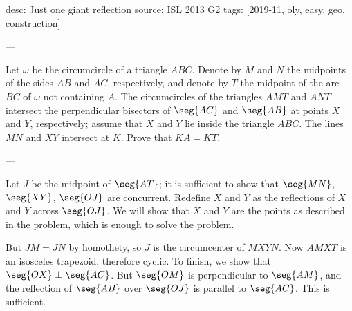 desc: Just one giant reflection
source: ISL 2013 G2
tags: [2019-11, oly, easy, geo, construction]

---

Let $\omega$ be the circumcircle of a triangle $ABC$. Denote by $M$ and $N$ the midpoints of the sides $AB$ and $AC$, respectively, and denote by $T$ the midpoint of the arc $BC$ of $\omega$ not containing $A$. The circumcircles of the triangles $AMT$ and $ANT$ intersect the perpendicular bisectors of $\seg{AC}$ and $\seg{AB}$ at points $X$ and $Y$, respectively; assume that $X$ and $Y$ lie inside the triangle $ABC$. The lines $MN$ and $XY$ intersect at $K$. Prove that $KA=KT$.

---

Let $J$ be the midpoint of $\seg{AT}$; it is sufficient to show that $\seg{MN}$, $\seg{XY}$, $\seg{OJ}$ are concurrent. Redefine $X$ and $Y$ as the reflections of $X$ and $Y$ across $\seg{OJ}$. We will show that $X$ and $Y$ are the points as described in the problem, which is enough to solve the problem.

But $JM=JN$ by homothety, so $J$ is the circumcenter of $MXYN$. Now $AMXT$ is an isosceles trapezoid, therefore cyclic. To finish, we show that $\seg{OX}\perp\seg{AC}$. But $\seg{OM}$ is perpendicular to $\seg{AM}$, and the reflection of $\seg{AB}$ over $\seg{OJ}$ is parallel to $\seg{AC}$. This is sufficient.
